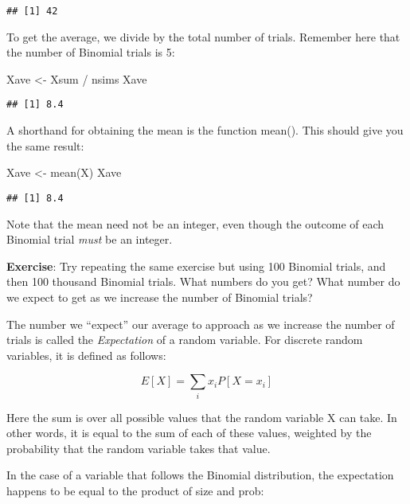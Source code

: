 \documentclass[
]{book}
\newenvironment{Shaded}{\begin{snugshade}}{\end{snugshade}}
\newcommand{\FunctionTok}[1]{\textcolor[rgb]{0.00,0.00,0.00}{#1}}
\newcommand{\NormalTok}[1]{#1}
\newcommand{\OtherTok}[1]{\textcolor[rgb]{0.56,0.35,0.01}{#1}}
\newcommand{\SpecialCharTok}[1]{\textcolor[rgb]{0.00,0.00,0.00}{#1}}
\begin{document}
\begin{verbatim}
## [1] 42
\end{verbatim}

To get the average, we divide by the total number of trials. Remember here that the number of Binomial trials is 5:

\begin{Shaded}
\begin{Highlighting}[]
\NormalTok{Xave }\OtherTok{\textless{}{-}}\NormalTok{ Xsum }\SpecialCharTok{/}\NormalTok{ nsims}
\NormalTok{Xave}
\end{Highlighting}
\end{Shaded}

\begin{verbatim}
## [1] 8.4
\end{verbatim}

A shorthand for obtaining the mean is the function mean(). This should give you the same result:

\begin{Shaded}
\begin{Highlighting}[]
\NormalTok{Xave }\OtherTok{\textless{}{-}} \FunctionTok{mean}\NormalTok{(X)}
\NormalTok{Xave}
\end{Highlighting}
\end{Shaded}

\begin{verbatim}
## [1] 8.4
\end{verbatim}

Note that the mean need not be an integer, even though the outcome of each Binomial trial \emph{must} be an integer.

\textbf{Exercise}: Try repeating the same exercise but using 100 Binomial trials, and then 100 thousand Binomial trials. What numbers do you get? What number do we expect to get as we increase the number of Binomial trials?

The number we ``expect'' our average to approach as we increase the number of trials is called the \emph{Expectation} of a random variable. For discrete random variables, it is defined as follows:

\[E[X] = \sum_{i}x_iP[X=x_i]\]

Here the sum is over all possible values that the random variable X can take. In other words, it is equal to the sum of each of these values, weighted by the probability that the random variable takes that value.

In the case of a variable that follows the Binomial distribution, the expectation happens to be equal to the product of size and prob:
\end{document}
